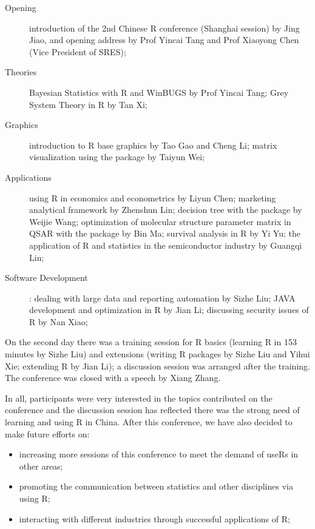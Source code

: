 \begin{description}
\item[Opening] introduction of the 2nd Chinese R conference (Shanghai
session) by Jing Jiao, and opening address by Prof Yincai Tang and
Prof Xiaoyong Chen (Vice President of SRES);

\item[Theories] Bayesian Statistics with R and WinBUGS by Prof Yincai Tang; Grey
System Theory in R by Tan Xi;

\item[Graphics] introduction to R base graphics by Tao Gao and Cheng Li; matrix
visualization using the package  by Taiyun Wei;

\item[Applications] using R in economics and
econometrics by Liyun Chen; marketing analytical framework by
Zhenshun Lin; decision tree with the  package by Weijie
Wang; optimization of molecular structure parameter matrix in QSAR
with the package  by Bin Ma; survival analysis in R by Yi
Yu; the application of R and statistics in the semiconductor
industry by Guangqi Lin;

\item[Software Development]: dealing with large data and reporting
automation by Sizhe Liu; JAVA development and optimization in R by
Jian Li; discussing security issues of R by Nan Xiao;
\end{description}

On the second day there was a training session for R basics
(learning R in 153 minutes by Sizhe Liu) and extensions (writing R
packages by Sizhe Liu and Yihui Xie; extending R by Jian Li); a
discussion session was arranged after the training. The conference
was closed with a speech by Xiang Zhang.

In all, participants were very interested in the topics contributed
on the conference and the discussion session has reflected there was
the strong need of learning and using R in China. After this
conference, we have also decided to make future efforts on:

\begin{itemize}
  \item increasing more sessions of this conference to meet the demand of useRs in other areas;
  \item promoting the communication between statistics and other disciplines via using R;
  \item interacting with different industries through successful applications of R;
\end{itemize}


